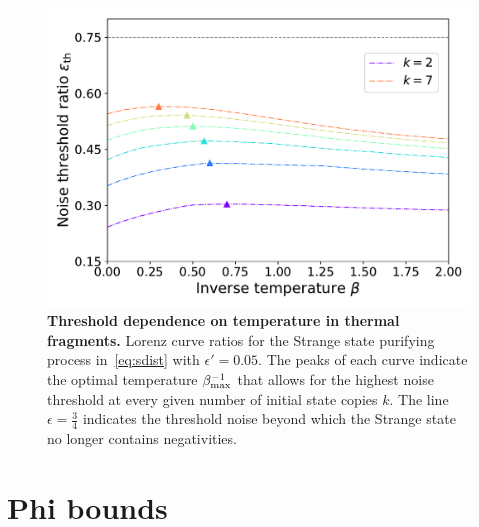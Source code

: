 \documentclass[pra,
aps,
twocolumn,
superscriptaddress,
groupedaddress,
nofootinbib,
reprint
]{revtex4-1}
\begin{document}
\begin{figure}[h]
    \centering
    \includegraphics[scale=0.5]{figs/thermal_distill.pdf}
    \caption{\textbf{Threshold dependence on temperature in thermal fragments.} Lorenz curve ratios for the Strange state purifying process in~\cref{eq:sdist} with $\epsilon' = 0.05$.
    The peaks of each curve indicate the optimal temperature $\beta_{\rm{max}}^{-1}$ that allows for the highest noise threshold at every given number of initial state copies $k$.
    The line $\epsilon = \frac{3}{4}$ indicates the threshold noise beyond which the Strange state no longer contains negativities.
    }
    \label{fig:thermal_distill}
\end{figure}

\null\newpage

\section{Phi bounds}
\end{document}
